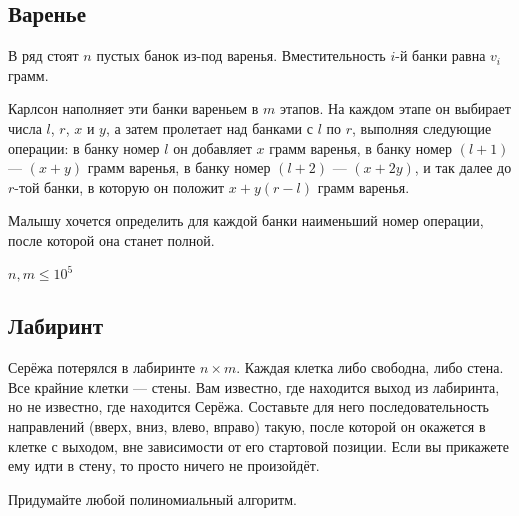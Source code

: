 \documentclass[11pt]{article}
\begin{document}
    \subsection{Варенье}\label{ux432ux430ux440ux435ux43dux44cux435}

В ряд стоят \(n\) пустых банок из-под варенья. Вместительность \(i\)-й
банки равна \(v_i\) грамм.

Карлсон наполняет эти банки вареньем в \(m\) этапов. На каждом этапе он
выбирает числа \(l\), \(r\), \(x\) и \(y\), а затем пролетает над
банками с \(l\) по \(r\), выполняя следующие операции: в банку номер
\(l\) он добавляет \(x\) грамм варенья, в банку номер \((l + 1)\) ---
\((x + y)\) грамм варенья, в банку номер \((l + 2)\) --- \((x + 2y)\), и
так далее до \(r\)-той банки, в которую он положит \(x + y(r - l)\)
грамм варенья.

Малышу хочется определить для каждой банки наименьший номер операции,
после которой она станет полной.

\(n, m \leq 10^5\)

    \subsection{Лабиринт}\label{ux43bux430ux431ux438ux440ux438ux43dux442}

Серёжа потерялся в лабиринте \(n \times m\). Каждая клетка либо
свободна, либо стена. Все крайние клетки --- стены. Вам известно, где
находится выход из лабиринта, но не известно, где находится Серёжа.
Составьте для него последовательность направлений (вверх, вниз, влево,
вправо) такую, после которой он окажется в клетке с выходом, вне
зависимости от его стартовой позиции. Если вы прикажете ему идти в
стену, то просто ничего не произойдёт.

Придумайте любой полиномиальный алгоритм.


    
    
    
    
\end{document}
